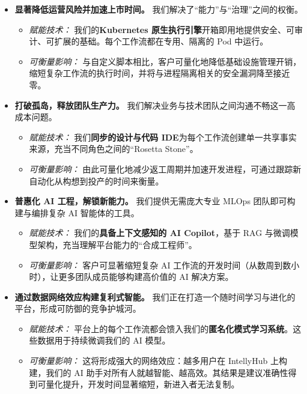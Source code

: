 \documentclass[11pt, a4paper, oneside]{article}
\begin{document}
\begin{itemize}
    \item \textbf{显著降低运营风险并加速上市时间。} 我们解决了“能力”与“治理”之间的权衡。
    \begin{itemize}
        \item \textit{赋能技术：} 我们的\textbf{Kubernetes 原生执行引擎}开箱即用地提供安全、可审计、可扩展的基础。每个工作流都在专用、隔离的 Pod 中运行。
        \item \textit{可衡量影响：} 与自定义脚本相比，客户可量化地降低基础设施管理开销，缩短复杂工作流的执行时间，并将与进程隔离相关的安全漏洞降至接近零。
    \end{itemize}

    \item \textbf{打破孤岛，释放团队生产力。} 我们解决业务与技术团队之间沟通不畅这一高成本问题。
    \begin{itemize}
        \item \textit{赋能技术：} 我们\textbf{同步的设计与代码 IDE}为每个工作流创建单一共享事实来源，充当不同角色之间的“Rosetta Stone”。
        \item \textit{可衡量影响：} 由此可量化地减少返工周期并加速开发进程，可通过跟踪新自动化从构想到投产的时间来衡量。
    \end{itemize}

    \item \textbf{普惠化 AI 工程，解锁新能力。} 我们提供无需庞大专业 MLOps 团队即可构建与编排复杂 AI 智能体的工具。
    \begin{itemize}
        \item \textit{赋能技术：} 我们的\textbf{具备上下文感知的 AI Copilot}，基于 RAG 与微调模型架构，充当理解平台能力的“合成工程师”。
        \item \textit{可衡量影响：} 客户可显著缩短复杂 AI 工作流的开发时间（从数周到数小时），让更多团队成员能够构建高价值的 AI 解决方案。
    \end{itemize}
    
    \item \textbf{通过数据网络效应构建复利式智能。} 我们正在打造一个随时间学习与进化的平台，形成可防御的竞争护城河。
    \begin{itemize}
        \item \textit{赋能技术：} 平台上的每个工作流都会馈入我们的\textbf{匿\-名化模式学习系统}。这些数据用于持续微调我们的 AI 模型。
        \item \textit{可衡量影响：} 这将形成强大的网络效应：越多用户在 IntellyHub 上构建，我们的 AI 助手对所有人就越智能、越高效。其结果是建议准确性得到可量化提升，开发时间显著缩短，新进入者无法复制。
    \end{itemize}
\end{itemize}
\end{document}
